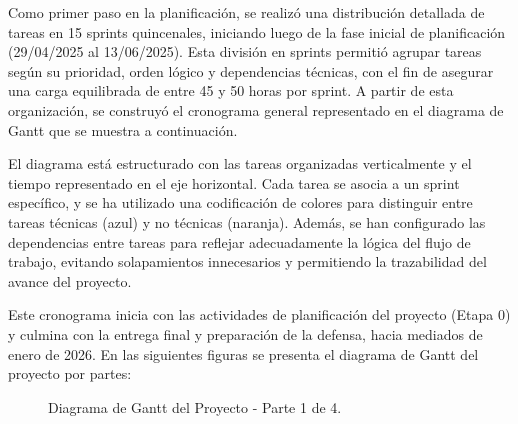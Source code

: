 \documentclass[
11pt, %
]{charter}
\begin{document}
Como primer paso en la planificación, se realizó una distribución detallada de tareas en 15 sprints quincenales, iniciando luego de la fase inicial de planificación (29/04/2025 al 13/06/2025). Esta división en sprints permitió agrupar tareas según su prioridad, orden lógico y dependencias técnicas, con el fin de asegurar una carga equilibrada de entre 45 y 50 horas por sprint. A partir de esta organización, se construyó el cronograma general representado en el diagrama de Gantt que se muestra a continuación.

El diagrama está estructurado con las tareas organizadas verticalmente y el tiempo representado en el eje horizontal. Cada tarea se asocia a un sprint específico, y se ha utilizado una codificación de colores para distinguir entre tareas técnicas (azul) y no técnicas (naranja). Además, se han configurado las dependencias entre tareas para reflejar adecuadamente la lógica del flujo de trabajo, evitando solapamientos innecesarios y permitiendo la trazabilidad del avance del proyecto.

Este cronograma inicia con las actividades de planificación del proyecto (Etapa 0) y culmina con la entrega final y preparación de la defensa, hacia mediados de enero de 2026. En las siguientes figuras se presenta el diagrama de Gantt del proyecto por partes:


\begin{figure}[htpb]
\centering
{}
\caption{Diagrama de Gantt del Proyecto - Parte 1 de 4.}
\label{fig:diagBloques}
\end{figure}
\end{document}
